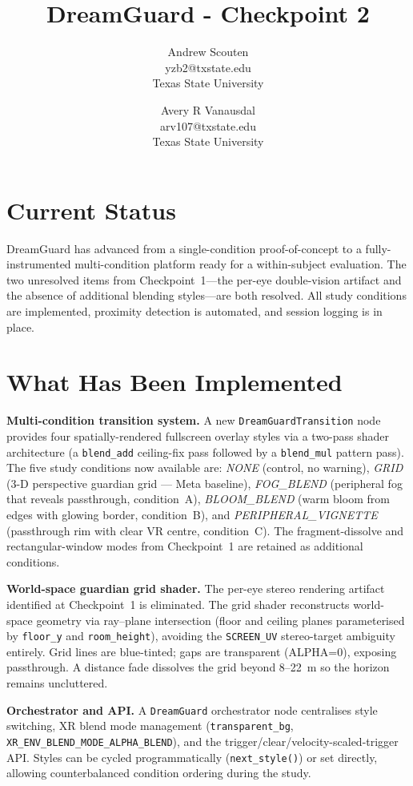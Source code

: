\documentclass{styling/vgtc}                          %
\title{DreamGuard - Checkpoint 2}
\author{Andrew Scouten\\ %
        \scriptsize{yzb2@txstate.edu}\\ %
        \scriptsize Texas State University
\and Avery R Vanausdal\\ %
        \scriptsize{arv107@txstate.edu}\\ %
        \scriptsize Texas State University}
\begin{document}
\maketitle
\thispagestyle{empty}
\vspace{-1em}

\section*{Current Status}

DreamGuard has advanced from a single-condition proof-of-concept to a
fully-instrumented multi-condition platform ready for a within-subject
evaluation. The two unresolved items from Checkpoint~1---the per-eye
double-vision artifact and the absence of additional blending styles---are
both resolved. All study conditions are implemented, proximity detection is
automated, and session logging is in place.

\section*{What Has Been Implemented}

\textbf{Multi-condition transition system.}
A new \texttt{DreamGuardTransition} node provides four spatially-rendered
fullscreen overlay styles via a two-pass shader architecture
(a \texttt{blend\_add} ceiling-fix pass followed by a \texttt{blend\_mul}
pattern pass). The five study conditions now available are:
\textit{NONE} (control, no warning),
\textit{GRID} (3-D perspective guardian grid --- Meta baseline),
\textit{FOG\_BLEND} (peripheral fog that reveals passthrough, condition~A),
\textit{BLOOM\_BLEND} (warm bloom from edges with glowing border, condition~B), and
\textit{PERIPHERAL\_VIGNETTE} (passthrough rim with clear VR centre, condition~C).
The fragment-dissolve and rectangular-window modes from Checkpoint~1 are
retained as additional conditions.

\textbf{World-space guardian grid shader.}
The per-eye stereo rendering artifact identified at Checkpoint~1 is
eliminated. The grid shader reconstructs world-space geometry via ray--plane
intersection (floor and ceiling planes parameterised by \texttt{floor\_y} and
\texttt{room\_height}), avoiding the \texttt{SCREEN\_UV} stereo-target
ambiguity entirely. Grid lines are blue-tinted; gaps are transparent (ALPHA=0),
exposing passthrough. A distance fade dissolves the grid beyond 8--22~m so
the horizon remains uncluttered.

\textbf{Orchestrator and API.}
A \texttt{DreamGuard} orchestrator node centralises style switching, XR blend
mode management (\texttt{transparent\_bg}, \texttt{XR\_ENV\_BLEND\_MODE\_ALPHA\_BLEND}),
and the trigger/clear/velocity-scaled-trigger API. Styles can be cycled
programmatically (\texttt{next\_style()}) or set directly, allowing
counterbalanced condition ordering during the study.
\end{document}
